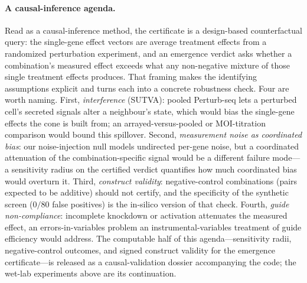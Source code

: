 \paragraph{A causal-inference agenda.}
Read as a causal-inference method, the certificate is a design-based counterfactual query: the
single-gene effect vectors are average treatment effects from a randomized perturbation
experiment, and an emergence verdict asks whether a combination's measured effect exceeds what any
non-negative mixture of those single treatment effects produces. That framing makes the identifying
assumptions explicit and turns each into a concrete robustness check. Four are worth naming. First,
\emph{interference} (SUTVA): pooled Perturb-seq lets a perturbed cell's secreted signals alter a
neighbour's state, which would bias the single-gene effects the cone is built from; an
arrayed-versus-pooled or MOI-titration comparison would bound this spillover. Second,
\emph{measurement noise as coordinated bias}: our noise-injection null models undirected per-gene
noise, but a coordinated attenuation of the combination-specific signal would be a different failure
mode---a sensitivity radius on the certified verdict quantifies how much coordinated bias would
overturn it. Third, \emph{construct validity}: negative-control combinations (pairs expected to be
additive) should not certify, and the specificity of the synthetic screen ($0/80$ false positives)
is the in-silico version of that check. Fourth, \emph{guide non-compliance}: incomplete knockdown
or activation attenuates the measured effect, an errors-in-variables problem an instrumental-variables
treatment of guide efficiency would address. The computable half of this agenda---sensitivity radii,
negative-control outcomes, and signed construct validity for the emergence certificate---is released
as a causal-validation dossier accompanying the code; the wet-lab experiments above are its
continuation.
